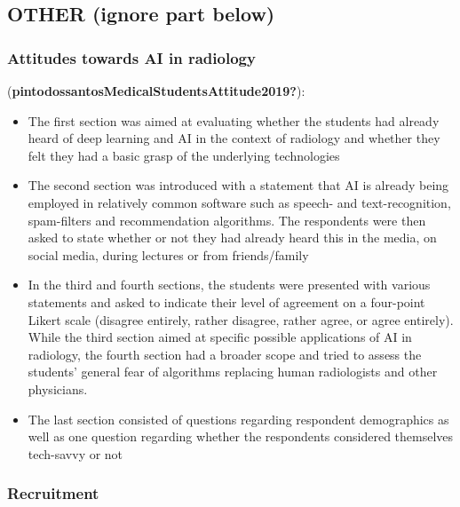 \documentclass[
  man]{apa7}
\providecommand{\tightlist}{%
  \setlength{\itemsep}{0pt}\setlength{\parskip}{0pt}}
\begin{document}
\hypertarget{other-ignore-part-below}{%
\subsection{OTHER (ignore part below)}\label{other-ignore-part-below}}

\hypertarget{attitudes-towards-ai-in-radiology}{%
\subsubsection{Attitudes towards AI in radiology}\label{attitudes-towards-ai-in-radiology}}

(\textbf{pintodossantosMedicalStudentsAttitude2019?}):

\begin{itemize}
\tightlist
\item
  The first section was aimed at evaluating whether the students had already heard
  of deep learning and AI in the context of radiology and whether they felt they had a basic grasp of the underlying technologies
\item
  The second section was introduced with a statement that AI is already being employed in relatively common software such as speech- and text-recognition, spam-filters and recommendation algorithms. The respondents were then asked to state whether or not they had already heard this in the media, on social media, during lectures or from friends/family
\item
  In the third and fourth sections, the students were presented with various statements and asked to indicate their level of agreement on a four-point Likert scale (disagree entirely, rather disagree, rather agree, or agree entirely). While the third section aimed at specific possible applications of AI in radiology, the fourth section had a broader scope and tried to assess the students' general fear of algorithms replacing human radiologists and other physicians.
\item
  The last section consisted of questions regarding respondent demographics as well as one question regarding whether the respondents considered themselves tech-savvy or not
\end{itemize}

\hypertarget{recruitment}{%
\subsubsection{Recruitment}\label{recruitment}}
\end{document}
